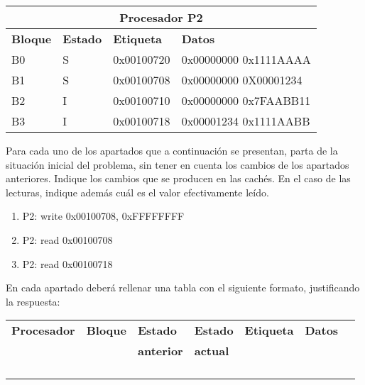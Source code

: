 \medskip

\begin{tabular}{|l|l|l|l|}
\hline
\multicolumn{4}{|c|}{Procesador P2}\\
\hline
\textbf{Bloque} &
\textbf{Estado} &
\textbf{Etiqueta} &
\textbf{Datos}
\\
\hline
\hline

B0 & S & 0x00100720 & 0x00000000 0x1111AAAA\\
\hline
B1 & S & 0x00100708 & 0x00000000 0X00001234\\
\hline
B2 & I & 0x00100710 & 0x00000000 0x7FAABB11\\
\hline
B3 & I & 0x00100718 & 0x00001234 0x1111AABB\\
\hline

\end{tabular}

\medskip

Para cada uno de los apartados que a continuación se presentan, parta de la
situación inicial del problema, sin tener en cuenta los cambios de los
apartados anteriores. Indique los cambios que se producen en las cachés. En el
caso de las lecturas, indique además cuál es el valor efectivamente leído.

\begin{enumerate}
  \item P2: write 0x00100708, 0xFFFFFFFF
  \item P2: read 0x00100708
  \item P2: read 0x00100718
\end{enumerate}

En cada apartado deberá rellenar una tabla con el siguiente formato,
justificando la respuesta: 

\begin{tabular}{|l|l|l|l|l|l|p{2cm}|p{2cm}|}

\hline
\textbf{Procesador} &
\textbf{Bloque} &
\textbf{Estado} &
\textbf{Estado} &
\textbf{Etiqueta} &
\multicolumn{2}{|c|}{\textbf{Datos}}
\\

&
&
\textbf{anterior} &
\textbf{actual} &
&
\multicolumn{2}{|c|}{}
\\
\hline
\hline

& & & & & \multicolumn{1}{|p{2cm}|}{} & \\
\hline
& & & & & \multicolumn{1}{|p{2cm}|}{} & \\
\hline
& & & & & \multicolumn{1}{|p{2cm}|}{} & \\
\hline
& & & & & \multicolumn{1}{|p{2cm}|}{} & \\
\hline
\end{tabular}

